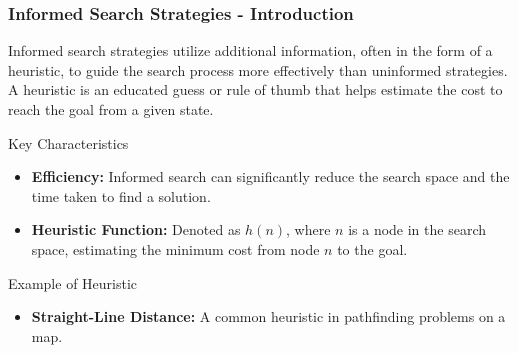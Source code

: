 \documentclass[aspectratio=169]{beamer}
\begin{document}
\begin{frame}[fragile]
    \frametitle{Informed Search Strategies - Introduction}
    Informed search strategies utilize additional information, often in the form of a heuristic, to guide the search process more effectively than uninformed strategies. A heuristic is an educated guess or rule of thumb that helps estimate the cost to reach the goal from a given state.
    
    \begin{block}{Key Characteristics}
        \begin{itemize}
            \item \textbf{Efficiency:} Informed search can significantly reduce the search space and the time taken to find a solution.
            \item \textbf{Heuristic Function:} Denoted as \( h(n) \), where \( n \) is a node in the search space, estimating the minimum cost from node \( n \) to the goal.
        \end{itemize}
    \end{block}

    \begin{block}{Example of Heuristic}
        \begin{itemize}
            \item \textbf{Straight-Line Distance:} A common heuristic in pathfinding problems on a map.
        \end{itemize}
    \end{block}
\end{frame}
\end{document}
